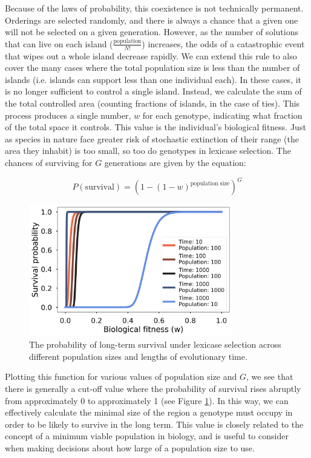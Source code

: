 Because of the laws of probability, this coexistence is not technically permanent. Orderings are selected randomly, and there is always a chance that a given one will not be selected on a given generation. However, as the number of solutions that can live on each island ($\frac{\text{population}}{N!}$) increases, the odds of a catastrophic event that wipes out a whole island decrease rapidly. We can extend this rule to also cover the many cases where the total population size is less than the number of islands (i.e. islands can support less than one individual each). In these cases, it is no longer sufficient to control a single island. Instead, we calculate the sum of the total controlled area (counting fractions of islands, in the case of ties). This process produces a single number, $w$ for each genotype, indicating what fraction of the total space it controls. This value is the individual's biological fitness. Just as species in nature face greater risk of stochastic extinction of their range (the area they inhabit) is too small, so too do genotypes in lexicase selection. The chances of surviving for $G$ generations are given by the equation:

\begin{equation}
P(\text{survival}) = (1 - (1-w)^{\text{population size}})^{G}
\end{equation}
\begin{figure}
\includegraphics[width=3.5in]{figs/survival.png}
\caption{The probability of long-term survival under lexicase selection across different population sizes and lengths of evolutionary time.}
\label{prob_survival}
\end{figure}

Plotting this function for various values of population size and $G$, we see that there is generally a cut-off value where the probability of survival rises abruptly from approximately 0 to approximately 1 (see Figure \ref{prob_survival}). In this way, we can effectively calculate the minimal size of the region a genotype must occupy in order to be likely to survive in the long term. This value is closely related to the concept of a minimum viable population in biology, and is useful to consider when making decisions about how large of a population size to use. 

